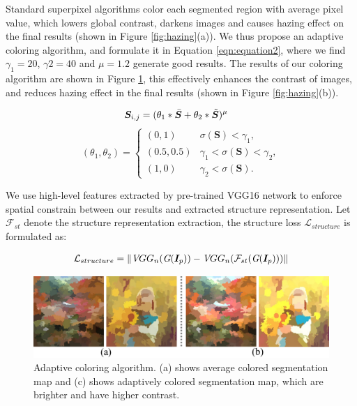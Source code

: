 \documentclass[10pt,twocolumn,letterpaper]{article}
\begin{document}
Standard superpixel algorithms color each segmented region with average pixel value, which lowers global contrast, darkens images and causes hazing effect on the final results (shown in Figure \ref{fig:hazing}(a)). We thus propose an adaptive coloring algorithm, and formulate it in Equation \ref{eqn:equation2}, where we find $\gamma_1=20$, $\gamma2=40$ and $\mu=1.2$ generate good results. The results of our coloring algorithm are shown in Figure \ref{fig:color_algorithm}, this effectively enhances the contrast of images, and reduces hazing effect in the final results (shown in Figure \ref{fig:hazing}(b)). 

\begin{equation}
\vspace{-0.5em}
\begin{aligned}
&\bm{S}_{i, j} = (\theta_1*\bar{\bm{S}} + \theta_2*\tilde{\bm{S}})^\mu
\end{aligned}
\label{eqn:equation2}
\end{equation}
\vspace{-0.5em}
\[(\theta_1, \theta_2)=\begin{cases}
(0, 1)&\sigma(\bm{S})<\gamma_1,\\
(0.5, 0.5)&\gamma_1<\sigma(\bm{S})<\gamma_2,\\
(1, 0)&\gamma_2<\sigma(\bm{S}).
\end{cases}\]

We use high-level features extracted by pre-trained VGG16 network \cite{simonyan2014very} to enforce spatial constrain between our results and extracted structure representation. Let $\mathcal{F}_{st}$ denote the structure representation extraction, the structure loss $\mathcal{L}_{structure}$ is formulated as:
\begin{small}
\begin{equation}
\vspace{-1em}
\begin{aligned}
\mathcal{L}_{structure} = \|{\textit VGG_n}({\textit G(\bm{I}_p)}) - {\textit VGG_n}(\mathcal{F}_{st}({\textit G(\bm{I}_p)}))\|
\end{aligned}
\label{eqn:equation3}
\vspace{-1em}
\end{equation}
\end{small}

\begin{figure}[t]
\centering
\includegraphics[width=\linewidth]{imgs/color_algorithm.pdf}
\caption{Adaptive coloring algorithm. (a) shows average colored segmentation map and (c) shows adaptively colored segmentation map, which are brighter and have higher contrast.}
\label{fig:color_algorithm}
\vspace{-0.5em}
\end{figure}
\end{document}
